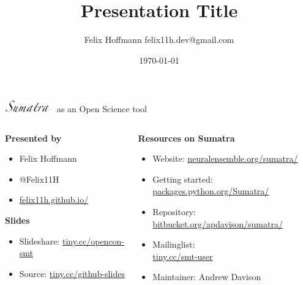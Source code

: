 \documentclass[xcolor=svgnames,11pt]{beamer}
\title {Presentation Title}
\author[Felix Hoffmann]{%
  Felix Hoffmann \vspace{0.25cm} \newline %
  \small felix11h.dev@gmail.com %
}
\institute[]{}
\date{\today}
\begin{document}



\begin{frame}
  \begin{center} 
    \Large 
    \includegraphics[width=2.0cm]{sumatra_logo_up.png} 
    \textcolor{white}{-}as an Open Science tool
  \end{center}
  
  \vspace{0.35cm}

  \begin{columns}[t]
    \begin{column}{0.4\textwidth}        
      \textbf{Presented by}
      \normalsize
      \vspace{0.18cm}
      \begin{itemize}[leftmargin=0.6cm]
      \item[] Felix Hoffmann
      \item[] @Felix11H
      \item[] \href{http://felix11h.github.io/}{felix11h.github.io/}
      \end{itemize}

      \vspace{0.38cm}
      \textbf{Slides}
      \normalsize
      \vspace{0.18cm}
      \begin{itemize}[leftmargin=0.6cm]
      \item[] Slideshare: \href{http://tiny.cc/opencon-smt}{tiny.cc/opencon-smt}
      \item[] Source: \href{http://tiny.cc/github-slides}{tiny.cc/github-slides}
      \end{itemize}


    \end{column}
    \begin{column}{0.64\textwidth}
      \textbf{Resources on Sumatra}
      \vspace{0.28cm}
      \normalsize 
      \begin{itemize}[leftmargin=0.6cm]
      \item[] Website:
        \href{http://neuralensemble.org/sumatra/}{neuralensemble.org/sumatra/}\\
      \item[]Getting started: \href{http://packages.python.org/Sumatra/}{packages.python.org/Sumatra/}\\
      \item[]Repository:
        \href{http://bitbucket.org/apdavison/sumatra/}{bitbucket.org/apdavison/sumatra/}
      \item[] Mailinglist: \\\href{http://tiny.cc/smt-user}{tiny.cc/smt-user}
      \item[] Maintainer: Andrew Davison 



\end{itemize}
\end{column}
\end{columns}
\end{frame}
\end{document}
